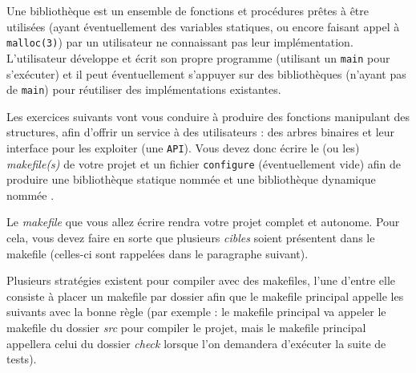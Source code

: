 

\vspace*{0.7cm}

\noindent {}

\bigskip

\noindent Une bibliothèque est un ensemble de fonctions et procédures prêtes à être utilisées (ayant éventuellement des variables statiques, ou encore faisant appel à \texttt{malloc(3)}) par un utilisateur ne connaissant pas leur implémentation.
L'utilisateur développe et écrit son propre programme (utilisant un \texttt{main} pour s'exécuter) et il peut éventuellement s'appuyer sur des bibliothèques (n'ayant pas de \texttt{main}) pour réutiliser des implémentations existantes.

\bigskip

\noindent Les exercices suivants vont vous conduire à produire des fonctions manipulant des structures, afin d'offrir un service à des utilisateurs : des arbres binaires et leur interface pour les exploiter (une \texttt{API}).
Vous devez donc écrire le (ou les) \textit{makefile(s)} de votre projet et un fichier \texttt{configure} (éventuellement vide) afin de produire une bibliothèque statique nommée  et une bibliothèque dynamique nommée .

\bigskip

\noindent Le \textit{makefile} que vous allez écrire rendra votre projet complet et autonome.
Pour cela, vous devez faire en sorte que plusieurs \textit{cibles} soient présentent dans le makefile (celles-ci sont rappelées dans le paragraphe suivant).

\bigskip

\noindent Plusieurs stratégies existent pour compiler avec des makefiles, l'une d'entre elle consiste à placer un makefile par dossier afin que le makefile principal appelle les suivants avec la bonne règle (par exemple : le makefile principal va appeler le makefile du dossier \textit{src} pour compiler le projet, mais le makefile principal appellera celui du dossier \textit{check} lorsque l'on demandera d'exécuter la suite de tests).

